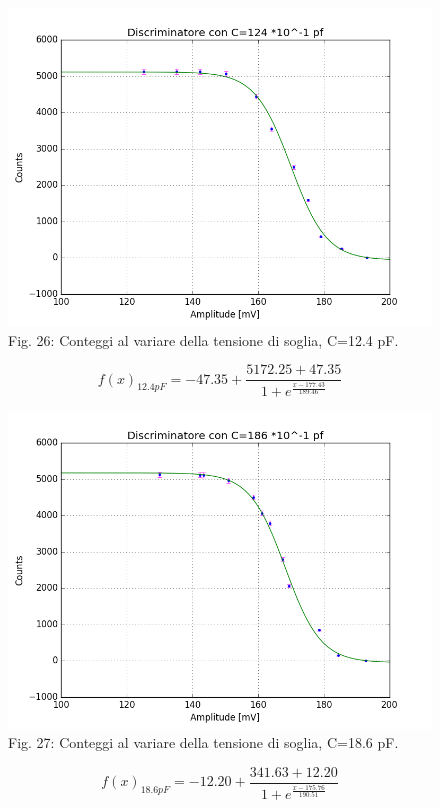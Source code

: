 \documentclass[a4paper]{article}
\begin{document}
\begin{figure}[H]
\includegraphics[width=1\textwidth]{discriminatore_124C}
        \caption{Fig. 26: Conteggi al variare della tensione di soglia, C=12.4 pF.}
        \label{fig:26}
\end{figure}
\begin{equation}
f(x)_{12.4 pF}= -47.35 + \frac{5172.25+47.35}{1+e^{\frac{x-177.43}{189.46}}}
\end{equation}

\begin{figure}[H]
\includegraphics[width=1\textwidth]{discriminatore_186C}
        \caption{Fig. 27: Conteggi al variare della tensione di soglia, C=18.6 pF.}
        \label{fig:27}
\end{figure}
\begin{equation}
f(x)_{18.6 pF}= -12.20 + \frac{341.63+12.20}{1+e^{\frac{x-175.76}{190.51}}}
\end{equation}
\end{document}
